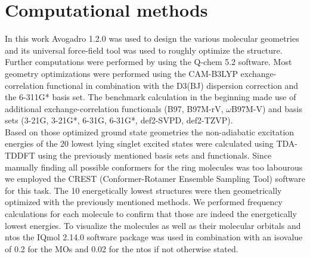 \chapter{Computational methods}
In this work Avogadro 1.2.0 was used to design the various molecular geometries and its universal force-field tool was used to roughly optimize the structure. 
Further computations were performed by using the Q-chem 5.2 software.\cite{qchem} Most geometry optimizations were performed using the CAM-B3LYP\cite{CAMB3LYP} exchange-correlation functional in combination with the D3(BJ)\cite{DJBJ} dispersion correction and the 6-311G*\cite{6311G} basis set. 
The benchmark calculation in the beginning made use of additional exchange-correlation functionals (B97,\cite{B97} B97M-rV,\cite{B97MV} $\omega$B97M-V\cite{w97MV}) and basis sets (3-21G,\cite{321G} 3-21G*,\cite{321G} 6-31G,\cite{631G} 6-31G*,\cite{631G} def2-SVPD,\cite{def2} def2-TZVP\cite{def2}). \\
Based on those optimized ground state geometries the non-adiabatic excitation energies of the 20 lowest lying singlet excited states were calculated using TDA-TDDFT\cite{TDA_TDDFT} using the previously mentioned basis sets and functionals. 
Since manually finding all possible conformers for the ring molecules was too labourous we employed the CREST\cite{crest} (Conformer-Rotamer Ensemble Sampling Tool) software for this task. The 10 energetically lowest structures were then geometrically optimized with the previously mentioned methods. 
We performed frequency calculations for each molecule to confirm that those are indeed the energetically lowest energies. 
To visualize the molecules as well as their molecular orbitals and ntos the IQmol 2.14.0 software package was used in combination with an isovalue of 0.2 for the MOs and 0.02 for the ntos if not otherwise stated.
%
%
